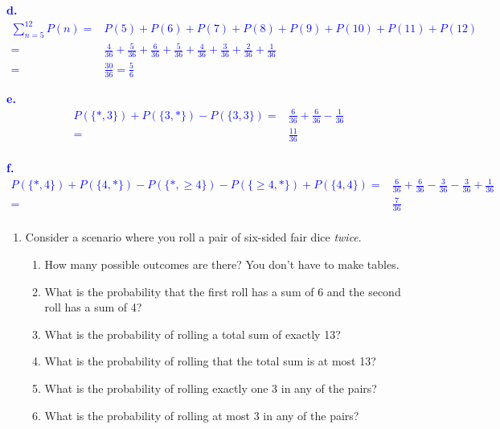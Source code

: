 \documentclass[
]{article}
\providecommand{\tightlist}{%
  \setlength{\itemsep}{0pt}\setlength{\parskip}{0pt}}
\begin{document}
\textcolor{blue}{\textbf{d.} 
\begin{align*}
\sum_{n=5}^{12} P(n) = & P(5) + P(6) + P(7) + P(8) + P(9) + P(10) + P(11) + P(12) \\
                     = & \frac{4}{36} + \frac{5}{36} + \frac{6}{36} + \frac{5}{36} + \frac{4}{36}+ \frac{3}{36} + \frac{2}{36} + \frac{1}{36} \\
                     = & \frac{30}{36} = \frac{5}{6}
\end{align*}}

\textcolor{blue}{\textbf{e.} 
\begin{align*}
P(\{*,3\}) + P(\{3,*\}) - P(\{3,3\}) = & \frac{6}{36} + \frac{6}{36} - \frac{1}{36} \\ 
                                     = & \frac{11}{36} \\
\end{align*}}

\textcolor{blue}{\textbf{f.} 
\begin{align*}
P(\{*,4\}) + P(\{4,*\}) - P(\{*,\ge 4\}) - P(\{\ge 4,*\}) + P(\{4,4\}) = & \frac{6}{36} + \frac{6}{36} - \frac{3}{36} - \frac{3}{36} + \frac{1}{36} \\
                                                                       = & \frac{7}{36} \\
\end{align*}}

\hfill\break

\begin{enumerate}
\def\labelenumi{\arabic{enumi}.}
\setcounter{enumi}{1}
\item
  Consider a scenario where you roll a pair of six-sided fair dice \emph{twice}.

  \begin{enumerate}
  \def\labelenumii{\alph{enumii}.}
  \tightlist
  \item
    How many possible outcomes are there? You don't have to make tables.
  \item
    What is the probability that the first roll has a sum of 6 and the second roll has a sum of 4?
  \item
    What is the probability of rolling a total sum of exactly 13?
  \item
    What is the probability of rolling that the total sum is at most 13?
  \item
    What is the probability of rolling exactly one 3 in any of the pairs?
  \item
    What is the probability of rolling at most 3 in any of the pairs?
  \end{enumerate}
\end{enumerate}
\end{document}
